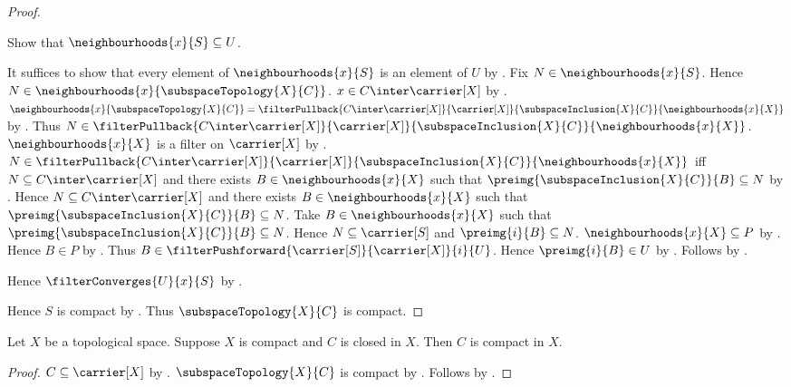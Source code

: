 \begin{proof}
\begin{subproof}
        Show that $\neighbourhoods{x}{S}\subseteq U$.
        \begin{subproof}
            It suffices to show that every element of
                $\neighbourhoods{x}{S}$ is an element of $U$ by
                .
            Fix $N\in\neighbourhoods{x}{S}$.
            Hence $N\in\neighbourhoods{x}{\subspaceTopology{X}{C}}$.
            $x\in C\inter\carrier[X]$ by .
            $\neighbourhoods{x}{\subspaceTopology{X}{C}}
                =\filterPullback{C\inter\carrier[X]}{\carrier[X]}{
                    \subspaceInclusion{X}{C}}{
                    \neighbourhoods{x}{X}}$ by
                .
            Thus $N\in
                \filterPullback{C\inter\carrier[X]}{\carrier[X]}{
                    \subspaceInclusion{X}{C}}{
                    \neighbourhoods{x}{X}}$.
            $\neighbourhoods{x}{X}$ is a filter on $\carrier[X]$ by
                .
            $N\in
                \filterPullback{C\inter\carrier[X]}{\carrier[X]}{
                    \subspaceInclusion{X}{C}}{
                    \neighbourhoods{x}{X}}$ iff
                $N\subseteq C\inter\carrier[X]$ and there exists
                $B\in\neighbourhoods{x}{X}$ such that
                $\preimg{\subspaceInclusion{X}{C}}{B}\subseteq N$ by
                .
            Hence $N\subseteq C\inter\carrier[X]$ and there exists
                $B\in\neighbourhoods{x}{X}$ such that
                $\preimg{\subspaceInclusion{X}{C}}{B}\subseteq N$.
            Take $B\in\neighbourhoods{x}{X}$ such that
                $\preimg{\subspaceInclusion{X}{C}}{B}\subseteq N$.
            Hence $N\subseteq\carrier[S]$ and
                $\preimg{i}{B}\subseteq N$.
            $\neighbourhoods{x}{X}\subseteq P$ by
                .
            Hence $B\in P$ by .
            Thus $B\in
                \filterPushforward{\carrier[S]}{\carrier[X]}{i}{U}$.
            Hence $\preimg{i}{B}\in U$ by
                .
            Follows by .
        \end{subproof}
        Hence $\filterConverges{U}{x}{S}$ by
            .
    \end{subproof}
    Hence $S$ is compact by
        .
    Thus $\subspaceTopology{X}{C}$ is compact.
\end{proof}

\begin{corollary}\label{closed_subset_of_compact_is_compact}
    Let $X$ be a topological space.
    Suppose $X$ is compact and $C$ is closed in $X$.
    Then $C$ is compact in $X$.
\end{corollary}
\begin{proof}
    $C\subseteq\carrier[X]$ by .
    $\subspaceTopology{X}{C}$ is compact by
        .
    Follows by .
\end{proof}
